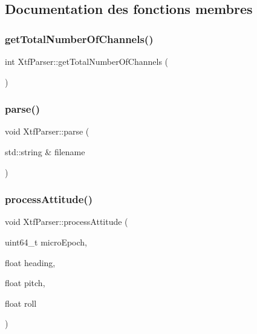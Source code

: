 \subsection{Documentation des fonctions membres}
\mbox{\label{classXtfParser_a9d9d875429479e3d837860365f120969}} 
\subsubsection{\texorpdfstring{get\+Total\+Number\+Of\+Channels()}{getTotalNumberOfChannels()}}
{\footnotesize\ttfamily int Xtf\+Parser\+::get\+Total\+Number\+Of\+Channels (\begin{DoxyParamCaption}{ }\end{DoxyParamCaption})}

\mbox{\label{classXtfParser_ab123eca9033ded892f7dab148257db12}} 
\subsubsection{\texorpdfstring{parse()}{parse()}}
{\footnotesize\ttfamily void Xtf\+Parser\+::parse (\begin{DoxyParamCaption}\item[{std\+::string \&}]{filename }\end{DoxyParamCaption})}

\mbox{\label{classXtfParser_a0fd79d938b6556f028330bba8513a32f}} 
\subsubsection{\texorpdfstring{process\+Attitude()}{processAttitude()}}
{\footnotesize\ttfamily void Xtf\+Parser\+::process\+Attitude (\begin{DoxyParamCaption}\item[{uint64\+\_\+t}]{micro\+Epoch,  }\item[{float}]{heading,  }\item[{float}]{pitch,  }\item[{float}]{roll }\end{DoxyParamCaption})}

